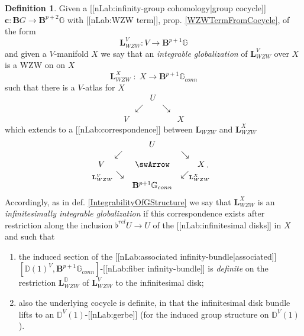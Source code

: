\documentclass[12pt,titlepage]{article}
\def\mathllap{\mathpalette\mathllapinternal}
\def\mathrlap{\mathpalette\mathrlapinternal}
\def\mathllapinternal#1#2{\llap{$\mathsurround=0pt#1{#2}$}}
\def\mathrlapinternal#1#2{\rlap{$\mathsurround=0pt#1{#2}$}}
\newcommand{\itexarray}[1]{\begin{matrix}#1\end{matrix}}
\theoremstyle{plain}
\theoremstyle{definition}
\newtheorem{defn}{Definition}
\theoremstyle{remark}
\begin{document}
\begin{defn}
\label{DefiniteGlobalizationofWZWTerm}\hypertarget{DefiniteGlobalizationofWZWTerm}{}
Given a [[nLab:infinity-group cohomology|group cocycle]] $\mathbf{c} \colon \mathbf{B}G\to\mathbf{B}^{p+2}\mathbb{G}$ with [[nLab:WZW term]], prop. \ref{WZWTermFromCocycle}, of the form
\begin{displaymath}
\mathbf{L}_{WZW}^V
  \colon
  V \longrightarrow \mathbf{B}^{p+1}\mathbb{G}
\end{displaymath}
and given a $V$-manifold $X$ we say that an \emph{integrable globalization} of $\mathbf{L}_{WZW}^V$ over $X$ is a WZW on on $X$
\begin{displaymath}
\mathbf{L}_{WZW}^X \;\colon\;X \longrightarrow \mathbf{B}^{p+1}\mathbb{G}_{conn}
\end{displaymath}
such that there is a $V$-atlas for $X$
\begin{displaymath}
\itexarray{
     && U
     \\
     & \swarrow && \searrow
     \\
     V && && X
  }
\end{displaymath}
which extends to a [[nLab:correspondence]] between $\mathbf{L}_{WZW}$ and $\mathbf{L}_{WZW}^X$
\begin{displaymath}
\itexarray{
     && U
     \\
     & \swarrow && \searrow
     \\
     V && \swArrow && X
     \\
     & {}_{\mathllap{\mathbf{L}_{WZW}^V}}\searrow && \swarrow_{\mathrlap{\mathbf{L}_{WZW}^X}}
     \\
     && \mathbf{B}^{p+1}\mathbb{G}_{conn}
  }
  \,.
\end{displaymath}
Accordingly, as in def. \ref{IntegrabilityOfGStructure} we say that $\mathbf{L}_{WZW}^X$ is an \emph{infinitesimally integrable globalization} if this correspondence exists after restriction along the inclusion $\flat^{rel} U \to U$ of the [[nLab:infinitesimal disks]] in $X$ and such that
\begin{enumerate}%
\item the induced section of the [[nLab:associated infinity-bundle|associated]] $[\mathbb{D}(1)^V,\mathbf{B}^{p+1}\mathbb{G}_{conn}]$-[[nLab:fiber infinity-bundle]] is \emph{definite} on the restriction $\mathbf{L}_{WZW}^{\mathbb{D}}$ of $\mathbf{L}_{WZW}^V$ to the infinitesimal disk;
\item also the underlying cocycle is definite, in that the infinitesimal disk bundle lifts to an $\mathbb{D}^V(1)$-[[nLab:gerbe]] (for the induced group structure on $\mathbb{D}^V(1)$).
\end{enumerate}
\end{defn}
\end{document}
